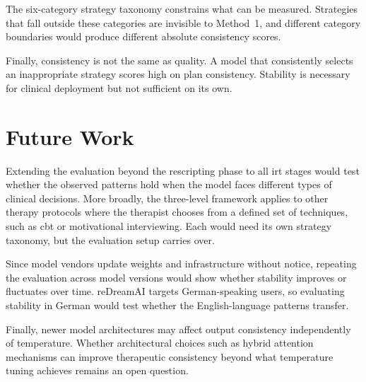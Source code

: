 The six-category strategy taxonomy constrains what can be measured.
Strategies that fall outside these categories are invisible to Method~1,
and different category boundaries would produce different absolute
consistency scores.

Finally, consistency is not the same as quality. A model that consistently
selects an inappropriate strategy scores high on plan consistency.
Stability is necessary for clinical deployment but not sufficient on its
own.


\section{Future Work}
\label{sec:concl-future}

Extending the evaluation beyond the rescripting phase to all \gls{irt}
stages would test whether the observed patterns hold when the
model faces different types of clinical decisions. More broadly, the
three-level framework applies to other therapy protocols where the
therapist chooses from a defined set of techniques, such as \gls{cbt} or
motivational interviewing. Each would need its own strategy taxonomy, but
the evaluation setup carries over.

Since model vendors update weights and infrastructure without notice,
repeating the evaluation across model versions would show whether
stability improves or fluctuates over time. reDreamAI targets
German-speaking users, so evaluating stability in German would test
whether the English-language patterns transfer.

Finally, newer model architectures may affect output consistency
independently of temperature. Whether architectural choices such as
hybrid attention mechanisms can improve therapeutic consistency beyond
what temperature tuning achieves remains an open question.

